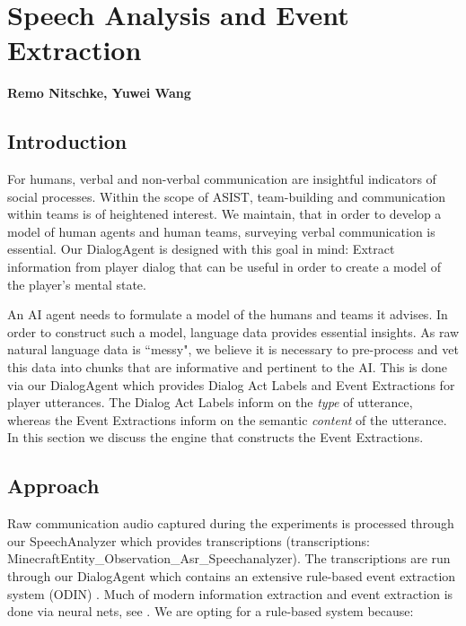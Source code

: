 \chapter{Speech Analysis and Event Extraction}
\textbf{Remo Nitschke, Yuwei Wang}
\section{Introduction}

For humans, verbal and non-verbal communication are insightful indicators of social processes. Within the scope of ASIST, team-building and communication within teams is of heightened interest. We maintain, that in order to develop a model of human agents and human teams, surveying verbal communication is essential. Our DialogAgent is designed with this goal in mind: Extract information from player dialog that can be useful in order to create a model of the player's mental state.

An AI agent needs to formulate a model of the humans and teams it advises. In order to construct such a model, language data provides essential insights. As raw natural language data is ``messy", we believe it is necessary to pre-process and vet this data into chunks that are informative and pertinent to the AI. This is done via our DialogAgent which provides Dialog Act Labels and Event Extractions for player utterances. The Dialog Act Labels inform on the \emph{type} of utterance, whereas the Event Extractions inform on the semantic \emph{content} of the utterance. In this section we discuss the engine that constructs the Event Extractions.



\section{Approach}


Raw communication audio captured during the experiments is processed through
our SpeechAnalyzer which provides transcriptions (transcriptions:
MinecraftEntity\_Observation\_Asr\_Speechanalyzer). The transcriptions are run through our DialogAgent which contains an extensive rule-based event extraction system (ODIN) \citep{valenzuela-escarcega-etal-2016-odins}. Much of modern information extraction and event extraction is done via neural nets, see \citet{Ahmad2021GATEGA,Du2020EventEB}. We are opting for a rule-based system because:


